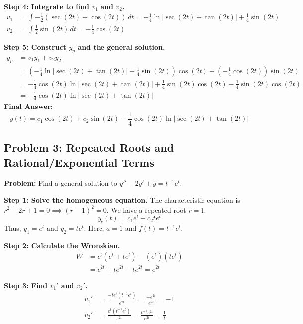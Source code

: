 \documentclass{article}
\begin{document}
\textbf{Step 4: Integrate to find $v_1$ and $v_2$.}
\begin{align*}
v_1 &= \int -\frac{1}{2} (\sec(2t) - \cos(2t)) \, dt = -\frac{1}{4} \ln\left|\sec(2t) + \tan(2t)\right| + \frac{1}{4} \sin(2t) \\
v_2 &= \int \frac{1}{2} \sin(2t) \, dt = -\frac{1}{4} \cos(2t)
\end{align*}

\textbf{Step 5: Construct $y_p$ and the general solution.}
\begin{align*}
y_p &= v_1 y_1 + v_2 y_2 \\
&= \left( -\frac{1}{4} \ln\left|\sec(2t) + \tan(2t)\right| + \frac{1}{4} \sin(2t) \right) \cos(2t) + \left( -\frac{1}{4} \cos(2t) \right) \sin(2t) \\
&= -\frac{1}{4} \cos(2t) \ln\left|\sec(2t) + \tan(2t)\right| + \frac{1}{4} \sin(2t)\cos(2t) - \frac{1}{4} \sin(2t)\cos(2t) \\
&= -\frac{1}{4} \cos(2t) \ln\left|\sec(2t) + \tan(2t)\right|
\end{align*}
\textbf{Final Answer:}
\[ y(t) = c_1 \cos(2t) + c_2 \sin(2t) - \frac{1}{4} \cos(2t) \ln\left|\sec(2t) + \tan(2t)\right| \]

\subsection{Problem 3: Repeated Roots and Rational/Exponential Terms}
\textbf{Problem:} Find a general solution to $y'' - 2y' + y = t^{-1}e^t$.

\textbf{Step 1: Solve the homogeneous equation.}
The characteristic equation is $r^2 - 2r + 1 = 0 \implies (r-1)^2 = 0$. We have a repeated root $r = 1$.
\[ y_c(t) = c_1 e^t + c_2 t e^t \]
Thus, $y_1 = e^t$ and $y_2 = t e^t$. Here, $a = 1$ and $f(t) = t^{-1}e^t$.

\textbf{Step 2: Calculate the Wronskian.}
\begin{align*}
W &= e^t(e^t + t e^t) - (e^t)(t e^t) \\
&= e^{2t} + t e^{2t} - t e^{2t} = e^{2t}
\end{align*}

\textbf{Step 3: Find $v_1'$ and $v_2'$.}
\begin{align*}
v_1' &= \frac{-t e^t (t^{-1}e^t)}{e^{2t}} = \frac{-e^{2t}}{e^{2t}} = -1 \\
v_2' &= \frac{e^t (t^{-1}e^t)}{e^{2t}} = \frac{t^{-1}e^{2t}}{e^{2t}} = \frac{1}{t}
\end{align*}
\end{document}
